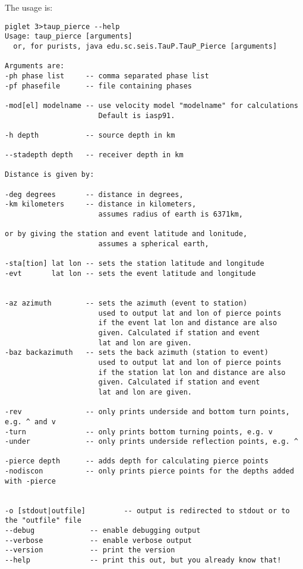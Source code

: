 The usage is:
\begin{verbatim}
piglet 3>taup_pierce --help
Usage: taup_pierce [arguments]
  or, for purists, java edu.sc.seis.TauP.TauP_Pierce [arguments]

Arguments are:
-ph phase list     -- comma separated phase list
-pf phasefile      -- file containing phases

-mod[el] modelname -- use velocity model "modelname" for calculations
                      Default is iasp91.

-h depth           -- source depth in km

--stadepth depth   -- receiver depth in km

Distance is given by:

-deg degrees       -- distance in degrees,
-km kilometers     -- distance in kilometers,
                      assumes radius of earth is 6371km,

or by giving the station and event latitude and lonitude,
                      assumes a spherical earth,

-sta[tion] lat lon -- sets the station latitude and longitude
-evt       lat lon -- sets the event latitude and longitude


-az azimuth        -- sets the azimuth (event to station)
                      used to output lat and lon of pierce points
                      if the event lat lon and distance are also
                      given. Calculated if station and event
                      lat and lon are given.
-baz backazimuth   -- sets the back azimuth (station to event)
                      used to output lat and lon of pierce points
                      if the station lat lon and distance are also
                      given. Calculated if station and event
                      lat and lon are given.

-rev               -- only prints underside and bottom turn points, e.g. ^ and v
-turn              -- only prints bottom turning points, e.g. v
-under             -- only prints underside reflection points, e.g. ^

-pierce depth      -- adds depth for calculating pierce points
-nodiscon          -- only prints pierce points for the depths added with -pierce


-o [stdout|outfile]         -- output is redirected to stdout or to the "outfile" file
--debug             -- enable debugging output
--verbose           -- enable verbose output
--version           -- print the version
--help              -- print this out, but you already know that!
\end{verbatim} 
 
